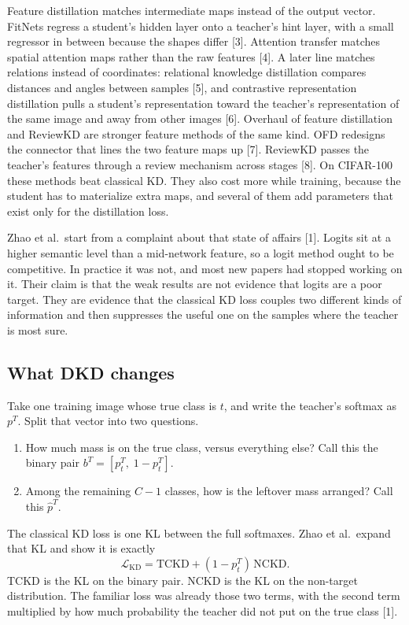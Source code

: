 \documentclass[11pt]{article}
\begin{document}
Feature distillation matches intermediate maps instead of the output vector. FitNets regress a student's hidden layer onto a teacher's hint layer, with a small regressor in between because the shapes differ [3]. Attention transfer matches spatial attention maps rather than the raw features [4]. A later line matches relations instead of coordinates: relational knowledge distillation compares distances and angles between samples [5], and contrastive representation distillation pulls a student's representation toward the teacher's representation of the same image and away from other images [6]. Overhaul of feature distillation and ReviewKD are stronger feature methods of the same kind. OFD redesigns the connector that lines the two feature maps up [7]. ReviewKD passes the teacher's features through a review mechanism across stages [8]. On CIFAR-100 these methods beat classical KD. They also cost more while training, because the student has to materialize extra maps, and several of them add parameters that exist only for the distillation loss.

Zhao et al.\ start from a complaint about that state of affairs [1]. Logits sit at a higher semantic level than a mid-network feature, so a logit method ought to be competitive. In practice it was not, and most new papers had stopped working on it. Their claim is that the weak results are not evidence that logits are a poor target. They are evidence that the classical KD loss couples two different kinds of information and then suppresses the useful one on the samples where the teacher is most sure.

\subsection{What DKD changes}

Take one training image whose true class is \(t\), and write the teacher's softmax as \(p^{T}\). Split that vector into two questions.

\begin{enumerate}
\item How much mass is on the true class, versus everything else? Call this the binary pair \(b^{T} = [p^{T}_{t},\; 1 - p^{T}_{t}]\).
\item Among the remaining \(C - 1\) classes, how is the leftover mass arranged? Call this \(\hat{p}^{T}\).
\end{enumerate}

The classical KD loss is one KL between the full softmaxes. Zhao et al.\ expand that KL and show it is exactly
\begin{equation}
\mathcal{L}_{\mathrm{KD}} = \mathrm{TCKD} + (1 - p^{T}_{t})\,\mathrm{NCKD}.
\label{eq:kd}
\end{equation}
TCKD is the KL on the binary pair. NCKD is the KL on the non-target distribution. The familiar loss was already those two terms, with the second term multiplied by how much probability the teacher did not put on the true class [1].
\end{document}
